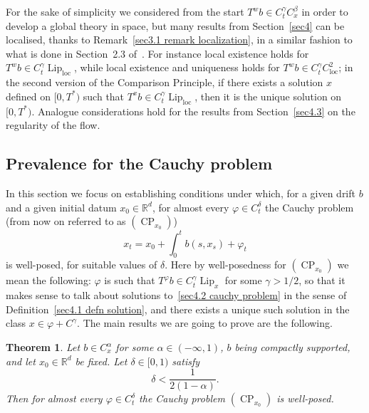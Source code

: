 \documentclass[10pt]{article}
\newcommand{\tmop}[1]{\ensuremath{\operatorname{#1}}}
\newtheorem{theorem}{Theorem}
\begin{document}
\begin{remark}
  \label{sec4.1 remark localization}For the sake of simplicity we considered
  from the start $T^w b \in C^{\gamma}_t C^{\beta}_x$ in order to develop a
  global theory in space, but many results from Section~\ref{sec4} can be
  localised, thanks to Remark~\ref{sec3.1 remark localization}, in a similar
  fashion to what is done in Section~2.3 of~{\cite{catelliergubinelli}}. For
  instance local existence holds for $T^w b \in C^{\gamma}_t
  \tmop{Lip}_{\tmop{loc}}$, while local existence and uniqueness holds for
  $T^w b \in C^{\gamma}_t C^2_{\tmop{loc}}$; in the second version of the
  Comparison Principle, if there exists a solution $x$ defined on $[0,
  T^{\ast})$ such that $T^x b \in C^{\gamma}_t \tmop{Lip}_{\tmop{loc}}$, then
  it is the unique solution on $[0, T^{\ast})$. Analogue considerations hold
  for the results from Section~\ref{sec4.3} on the regularity of the flow.
\end{remark}

\subsection{Prevalence for the Cauchy problem}\label{sec4.2}

In this section we focus on establishing conditions under which, for a given
drift $b$ and a given initial datum $x_0 \in \mathbb{R}^d$, for almost every
$\varphi \in C^{\delta}_t$ the Cauchy problem (from now on referred to as
$(\tmop{CP}_{x_0})$)
\begin{equation}
  x_t = x_0 + \int_0^t b (s, x_s) + \varphi_t \label{sec4.2 cauchy problem}
\end{equation}
is well-posed, for suitable values of $\delta$. Here by well-posedness for
$(\tmop{CP}_{x_0})$ we mean the following: $\varphi$ is such that $T^{\varphi}
b \in C^{\gamma}_t \tmop{Lip}_x$ for some $\gamma > 1 / 2$, so that it makes
sense to talk about solutions to~{\eqref{sec4.2 cauchy problem}} in the sense
of Definition~\ref{sec4.1 defn solution}, and there exists a unique such
solution in the class $x \in \varphi + C^{\gamma}$. The main results we are
going to prove are the following.

\begin{theorem}
  \label{sec4.2 thm main 1}Let $b \in C^{\alpha}_x$ for some $\alpha \in (-
  \infty, 1)$, $b$ being compactly supported, and let $x_0 \in \mathbb{R}^d$
  be fixed. Let $\delta \in [0, 1)$ satisfy
  \[ \delta < \frac{1}{2 (1 - \alpha)} . \]
  Then for almost every $\varphi \in C^{\delta}_t$ the Cauchy problem
  $(\tmop{CP}_{x_0})$ is well-posed.
\end{theorem}
\end{document}
